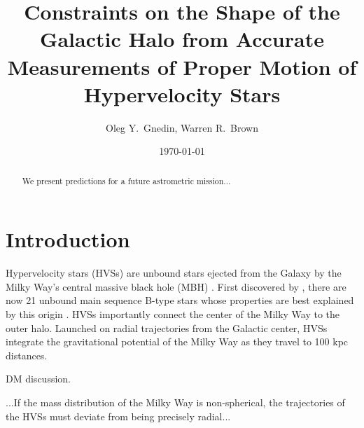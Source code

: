 \documentclass[iop]{emulateapj}
\begin{document}

\title{Constraints on the Shape of the Galactic Halo from Accurate Measurements of Proper Motion of Hypervelocity Stars}
        
\author{Oleg Y.\ Gnedin, Warren R.\ Brown}


\date{\today}

\begin{abstract}
We present predictions for a future astrometric mission...
\end{abstract}


\section{Introduction}


Hypervelocity stars (HVSs) are unbound stars ejected from the Galaxy by the 
Milky Way's central massive black hole (MBH) \citep{hills88, brown15}.  First 
discovered by \citet{brown05}, there are now 21 unbound main sequence B-type stars 
whose properties are best explained by this origin \citep{brown14}.  HVSs 
importantly connect the center of the Milky Way to the outer halo.  Launched on 
radial trajectories from the Galactic center, HVSs integrate the gravitational 
potential of the Milky Way as they travel to 100 kpc distances.


DM discussion.  


...If the mass distribution of the Milky Way is non-spherical, the 
trajectories of the HVSs must deviate from being precisely radial...

\end{document}
